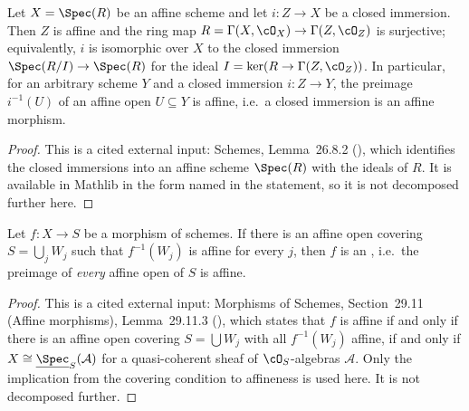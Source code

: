 \begin{lemma}
\label{lem:pc-closed-immersion-affine}
Let $X=\Spec(R)$ be an affine scheme and let $i:Z\to X$ be a closed
immersion.  Then $Z$ is affine and the ring map
$R=\Gamma(X,\cO_X)\to\Gamma(Z,\cO_Z)$ is surjective; equivalently, $i$
is isomorphic over $X$ to the closed immersion
$\Spec(R/I)\to\Spec(R)$ for the ideal $I=\ker(R\to\Gamma(Z,\cO_Z))$.
In particular, for an arbitrary scheme $Y$ and a closed immersion
$i:Z\to Y$, the preimage $i^{-1}(U)$ of an affine open $U\subseteq Y$
is affine, i.e.\ a closed immersion is an affine morphism.
\mathlibok\ 
\end{lemma}
\begin{proof}
This is a cited external input: Schemes, Lemma~26.8.2
(), which identifies the closed immersions into an
affine scheme $\Spec(R)$ with the ideals of $R$.  It is available in
Mathlib in the form named in the statement, so it is not decomposed
further here.
\end{proof}

\begin{lemma}
\label{lem:pc-affine-local-on-target}
Let $f:X\to S$ be a morphism of schemes.  If there is an affine open
covering $S=\bigcup_jW_j$ such that $f^{-1}(W_j)$ is affine for every
$j$, then $f$ is an , i.e.\ the preimage of \emph{every} affine open of $S$ is
affine.
\end{lemma}
\begin{proof}
This is a cited external input: Morphisms of Schemes, Section~29.11
(Affine morphisms), Lemma~29.11.3 (), which states
that $f$ is affine if and only if there is an affine open covering
$S=\bigcup W_j$ with all $f^{-1}(W_j)$ affine, if and only if
$X\cong\underline{\Spec}_S(\mathcal A)$ for a quasi-coherent sheaf of
$\cO_S$-algebras $\mathcal A$.  Only the implication from the covering
condition to affineness is used here.  It is not decomposed further.
\end{proof}

